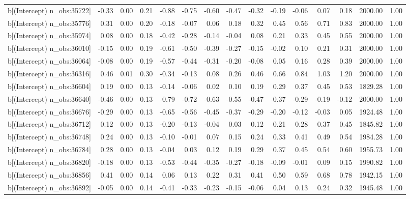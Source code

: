 \begin{table}[ht]
\begin{tabular}{rrrrrrrrrrrrrrr}
  b[(Intercept) n\_obs:35722] & -0.33 & 0.00 & 0.21 & -0.88 & -0.75 & -0.60 & -0.47 & -0.32 & -0.19 & -0.06 & 0.07 & 0.18 & 2000.00 & 1.00 \\ 
  b[(Intercept) n\_obs:35776] & 0.31 & 0.00 & 0.20 & -0.18 & -0.07 & 0.06 & 0.18 & 0.32 & 0.45 & 0.56 & 0.71 & 0.83 & 2000.00 & 1.00 \\ 
  b[(Intercept) n\_obs:35974] & 0.08 & 0.00 & 0.18 & -0.42 & -0.28 & -0.14 & -0.04 & 0.08 & 0.21 & 0.33 & 0.45 & 0.55 & 2000.00 & 1.00 \\ 
  b[(Intercept) n\_obs:36010] & -0.15 & 0.00 & 0.19 & -0.61 & -0.50 & -0.39 & -0.27 & -0.15 & -0.02 & 0.10 & 0.21 & 0.31 & 2000.00 & 1.00 \\ 
  b[(Intercept) n\_obs:36064] & -0.08 & 0.00 & 0.19 & -0.57 & -0.44 & -0.31 & -0.20 & -0.08 & 0.05 & 0.16 & 0.28 & 0.39 & 2000.00 & 1.00 \\ 
  b[(Intercept) n\_obs:36316] & 0.46 & 0.01 & 0.30 & -0.34 & -0.13 & 0.08 & 0.26 & 0.46 & 0.66 & 0.84 & 1.03 & 1.20 & 2000.00 & 1.00 \\ 
  b[(Intercept) n\_obs:36604] & 0.19 & 0.00 & 0.13 & -0.14 & -0.06 & 0.02 & 0.10 & 0.19 & 0.29 & 0.37 & 0.45 & 0.53 & 1829.28 & 1.00 \\ 
  b[(Intercept) n\_obs:36640] & -0.46 & 0.00 & 0.13 & -0.79 & -0.72 & -0.63 & -0.55 & -0.47 & -0.37 & -0.29 & -0.19 & -0.12 & 2000.00 & 1.00 \\ 
  b[(Intercept) n\_obs:36676] & -0.29 & 0.00 & 0.13 & -0.65 & -0.56 & -0.45 & -0.37 & -0.29 & -0.20 & -0.12 & -0.03 & 0.05 & 1924.48 & 1.00 \\ 
  b[(Intercept) n\_obs:36712] & 0.12 & 0.00 & 0.13 & -0.20 & -0.13 & -0.04 & 0.03 & 0.12 & 0.21 & 0.28 & 0.37 & 0.45 & 1845.82 & 1.00 \\ 
  b[(Intercept) n\_obs:36748] & 0.24 & 0.00 & 0.13 & -0.10 & -0.01 & 0.07 & 0.15 & 0.24 & 0.33 & 0.41 & 0.49 & 0.54 & 1984.28 & 1.00 \\ 
  b[(Intercept) n\_obs:36784] & 0.28 & 0.00 & 0.13 & -0.04 & 0.03 & 0.12 & 0.19 & 0.29 & 0.37 & 0.45 & 0.54 & 0.60 & 1955.73 & 1.00 \\ 
  b[(Intercept) n\_obs:36820] & -0.18 & 0.00 & 0.13 & -0.53 & -0.44 & -0.35 & -0.27 & -0.18 & -0.09 & -0.01 & 0.09 & 0.15 & 1990.82 & 1.00 \\ 
  b[(Intercept) n\_obs:36856] & 0.41 & 0.00 & 0.14 & 0.06 & 0.13 & 0.22 & 0.31 & 0.41 & 0.50 & 0.59 & 0.68 & 0.78 & 1942.15 & 1.00 \\ 
  b[(Intercept) n\_obs:36892] & -0.05 & 0.00 & 0.14 & -0.41 & -0.33 & -0.23 & -0.15 & -0.06 & 0.04 & 0.13 & 0.24 & 0.32 & 1945.48 & 1.00 \\ 

\end{tabular}
\end{table}

